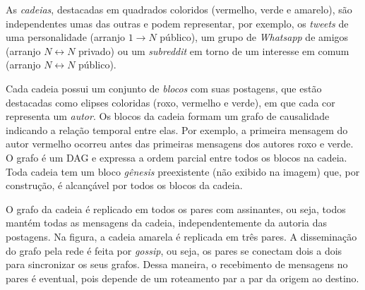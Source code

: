\documentclass[12pt]{article}
\newcommand{\Xon} {$1{\rightarrow}N$\xspace}
\newcommand{\Xnn} {$N{\leftrightarrow}N$\xspace}
\begin{document}
As \emph{cadeias}, destacadas em quadrados coloridos (vermelho, verde e
amarelo), são independentes umas das outras e podem representar, por exemplo,
os \emph{tweets} de uma personalidade (arranjo \Xon público), um grupo de
\emph{Whatsapp} de amigos (arranjo \Xnn privado) ou um \emph{subreddit} em
torno de um interesse em comum (arranjo \Xnn público).

Cada cadeia possui um conjunto de \emph{blocos} com suas postagens, que estão
destacadas como elipses coloridas (roxo, vermelho e verde), em que cada cor
representa um \emph{autor}.
Os blocos da cadeia formam um grafo de causalidade indicando a relação temporal
entre elas.
Por exemplo, a primeira mensagem do autor vermelho ocorreu antes das primeiras
mensagens dos autores roxo e verde.
O grafo é um DAG e expressa a ordem parcial entre todos os blocos na cadeia.
Toda cadeia tem um bloco \emph{gênesis} preexistente (não exibido na imagem)
que, por construção, é alcançável por todos os blocos da cadeia.

O grafo da cadeia é replicado em todos os pares com assinantes, ou seja, todos
mantém todas as mensagens da cadeia, independentemente da autoria das
postagens.
Na figura, a cadeia amarela é replicada em três pares.
A disseminação do grafo pela rede é feita por \emph{gossip}, ou seja, os pares
se conectam dois a dois para sincronizar os seus grafos.
Dessa maneira, o recebimento de mensagens no pares é eventual, pois depende de
um roteamento par a par da origem ao destino.
\end{document}
